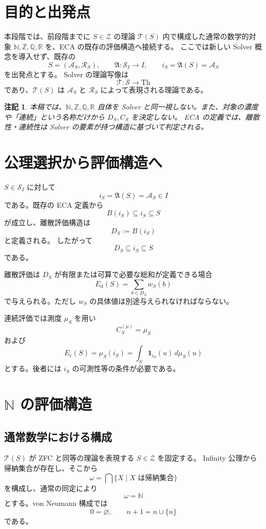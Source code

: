 \documentclass[a4paper,11pt]{article}
\newtheorem{remark}[definition]{注記}
\newcommand{\Solver}{\mathcal{S}}
\newcommand{\Aset}{\mathcal{A}}
\newcommand{\Rset}{\mathcal{R}}
\newcommand{\N}{\mathbb{N}}
\newcommand{\Z}{\mathbb{Z}}
\newcommand{\Q}{\mathbb{Q}}
\newcommand{\R}{\mathbb{R}}
\newcommand{\Zset}{\mathcal{Z}}
\begin{document}
\section{目的と出発点}
本段階では、前段階までに $S\in\Zset$ の理論 $\mathcal{T}(S)$ 内で構成した通常の数学的対象 $\N,\Z,\Q,\R$ を、ECA の既存の評価構造へ接続する。
ここでは新しい Solver 概念を導入せず、既存の
\[
S=(\Aset_S,\Rset_S),\qquad
\mathfrak{A}:\mathcal{S}_I\to I,
\qquad i_S=\mathfrak{A}(S)=\Aset_S
\]
を出発点とする。
Solver の理論写像は
\[
\mathcal{T}:\Solver\to\mathrm{Th}
\]
であり、$\mathcal{T}(S)$ は $\Aset_S$ と $\Rset_S$ によって表現される理論である。

\begin{remark}
本稿では、$\N,\Z,\Q,\R$ 自体を Solver と同一視しない。また、対象の濃度や「連続」という名称だけから $D_S,C_S$ を決定しない。
ECA の定義では、離散性・連続性は Solver の要素が持つ構造に基づいて判定される。
\end{remark}

\section{公理選択から評価構造へ}
$S\in\mathcal{S}_I$ に対して
\[
 i_S=\mathfrak{A}(S)=\Aset_S\in I
\]
である。既存の ECA 定義から
\[
 B(i_S)\subseteq i_S\subseteq S
\]
が成立し、離散評価構造は
\[
\boxed{D_S:=B(i_S)}
\]
と定義される。
したがって
\[
D_S\subseteq i_S\subseteq S
\]
である。

離散評価は $D_S$ が有限または可算で必要な総和が定義できる場合
\[
\boxed{E_{\mathrm{d}}(S)=\sum_{b\in D_S}w_S(b)}
\]
で与えられる。ただし $w_S$ の具体値は別途与えられなければならない。

連続評価では測度 $\mu_S$ を用い
\[
\boxed{C_S^{(\mu)}=\mu_S}
\]
および
\[
\boxed{E_{\mathrm{c}}(S)=\mu_S(i_S)=\int_S\mathbf1_{i_S}(u)\,d\mu_S(u)}
\]
とする。後者には $i_S$ の可測性等の条件が必要である。

\section{$\mathbb{N}$ の評価構造}
\subsection{通常数学における構成}
$\mathcal{T}(S)$ が ZFC と同等の理論を表現する $S\in\Zset$ を固定する。
Infinity 公理から帰納集合が存在し、そこから
\[
\omega=\bigcap\{X\mid X\text{ は帰納集合}\}
\]
を構成し、通常の同定により
\[
\omega=\N
\]
とする。von Neumann 構成では
\[
0=\varnothing,\qquad n+1=n\cup\{n\}
\]
である。
\end{document}
